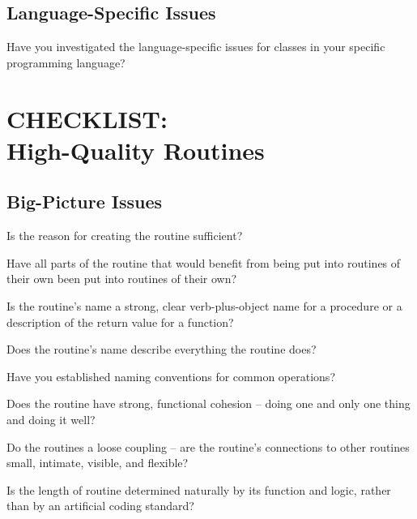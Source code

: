 \begin{multicols}{2}
\subsection*{Language-Specific Issues}
\begin{todolist}
  \item Have you investigated the language-specific issues for classes in your specific programming language?
\end{todolist}

\section*{CHECKLIST:\\High-Quality Routines}

\subsection*{Big-Picture Issues}
\begin{todolist}
  \item Is the reason for creating the routine sufficient?
  \item Have all parts of the routine that would benefit from being put into routines of their own been put into routines of their own?
  \item Is the routine's name a strong, clear verb-plus-object name for a procedure or a description of the return value for a function?
  \item Does the routine's name describe everything the routine does?
  \item Have you established naming conventions for common operations?
  \item Does the routine have strong, functional cohesion -- doing one and only one thing and doing it well?
  \item Do the routines a loose coupling -- are the routine's connections to other routines small, intimate, visible, and flexible?
  \item Is the length of routine determined naturally by its function and logic, rather than by an artificial coding standard?
\end{todolist}


\end{multicols}
